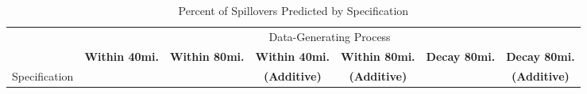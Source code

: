 \documentclass[aspectratio=169]{beamer}
\begin{document}
\begin{frame}
    \begin{table}[!tb]
        \caption{Percent of Spillovers Predicted by Specification}
        \label{tab:misspecification_mspe}
    
        \begin{adjustbox}{width = \textwidth, center}
            \begin{threeparttable}
                \begin{tabular}{@{} l rrrrrr @{}}
                    \toprule
                    & \multicolumn{6}{c}{Data-Generating Process} \\
                    \cmidrule{2-7}
    
                    & \multicolumn{1}{c}{\textbf{Within 40mi.}} & \multicolumn{1}{c}{\textbf{Within 80mi.}} & \multicolumn{1}{c}{\textbf{Within 40mi.}} & \multicolumn{1}{c}{\textbf{Within 80mi.}} & \multicolumn{1}{c}{\textbf{Decay 80mi.}} & \multicolumn{1}{c}{\textbf{Decay 80mi.}} \\
                    Specification & & & \multicolumn{1}{c}{\textbf{(Additive)}} & \multicolumn{1}{c}{\textbf{(Additive)}} & & \multicolumn{1}{c}{\textbf{(Additive)}} \\
    
     
                    \midrule
                    

\end{tabular}
\end{threeparttable}
\end{adjustbox}
\end{table}
\end{frame}
\end{document}
